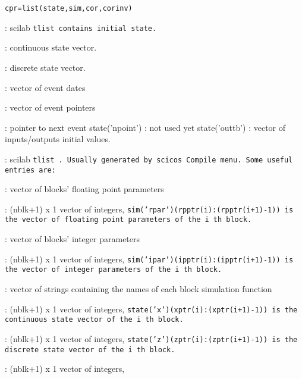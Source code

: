 \begin{verbatim}
cpr=list(state,sim,cor,corinv)
\end{verbatim}
\begin{scitem}
\item[{\verb?state?}]
: scilab %
\tt tlist %
\rm contains  initial state. 
\begin{scitem}
\item[{\verb?state('x')?}]
: continuous  state vector. 
\item[{\verb?state('z')?}]
: discrete  state vector. 
\item[{\verb?state('tevts')?}]
: vector of  event dates
\item[{\verb?state('evtspt')?}]
: vector of event pointers
\item[{\verb?state('pointi')?}]
: pointer to next event
state('npoint')
: not used yet
state('outtb')
: vector of inputs/outputs initial values.
\end{scitem}
\item[{\verb?sim?}]
: scilab %
\tt tlist%
\rm .  Usually generated by scicos
%
\tt Compile %
\rm menu. Some useful entries are:
\begin{scitem}
\item[{\verb?sim('rpar')?}]
: vector of blocks' floating point parameters
\item[{\verb?sim('rpptr')?}]
: (nblk+1) x 1 vector of integers, 
\tt sim('rpar')(rpptr(i):(rpptr(i+1)-1)) %
\rm is the vector of floating
point parameters of the %
\tt i%
\rm th block. 
\item[{\verb?sim('ipar')?}]
: vector of blocks' integer parameters
\item[{\verb?sim('ipptr')?}]
: (nblk+1) x 1 vector of integers, 
\tt sim('ipar')(ipptr(i):(ipptr(i+1)-1)) %
\rm is the vector of integer
parameters of the %
\tt i%
\rm th block. 
\item[{\verb?sim('funs')?}]
: vector of strings containing the names of each block simulation function
\item[{\verb?sim('xptr')?}]
: (nblk+1) x 1 vector of integers, 
\tt state('x')(xptr(i):(xptr(i+1)-1)) %
\rm is the continuous state
vector  of the %
\tt i%
\rm th block. 
\item[{\verb?sim('zptr')?}]
: (nblk+1) x 1 vector of integers, 
\tt state('z')(zptr(i):(zptr(i+1)-1)) %
\rm is the discrete state
vector  of the %
\tt i%
\rm th block. 
\item[{\verb?sim('inpptr')?}]
: (nblk+1) x 1 vector of integers, %

\end{scitem}
\end{scitem}
